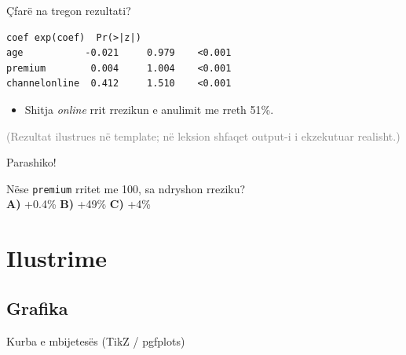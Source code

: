 \documentclass[aspectratio=169,10pt,xcolor={dvipsnames,table}]{beamer}
\newcommand{\shkoTe}[2]{\hyperlink{#1}{\beamergotobutton{#2}}}
\begin{document}
\begin{frame}[fragile]{Çfarë na tregon rezultati?}
\begin{lstlisting}[style=Rout]
                 coef exp(coef)  Pr(>|z|)
age           -0.021     0.979    <0.001
premium        0.004     1.004    <0.001
channelonline  0.412     1.510    <0.001
\end{lstlisting}
  \begin{itemize}
    \item Shitja \emph{online} rrit rrezikun e anulimit me rreth 51\%.
  \end{itemize}
  \footnotesize\textcolor{gray}{(Rezultat ilustrues në template; në leksion shfaqet output-i i ekzekutuar realisht.)}
\end{frame}

\begin{frame}[label=pyetja1]{Parashiko!}
  \begin{Parashiko}
    Nëse \texttt{premium} rritet me 100, sa ndryshon rreziku?\\[2pt]
    \textbf{A)} +0.4\% \quad \textbf{B)} +49\% \quad \textbf{C)} +4\%
  \end{Parashiko}
  \shkoTe{zgjidhja1}{Shiko zgjidhjen}
\end{frame}

\section{Ilustrime}
\subsection{Grafika}

\begin{frame}{Kurba e mbijetesës (TikZ / pgfplots)}
  \centering
\end{frame}
\end{document}
